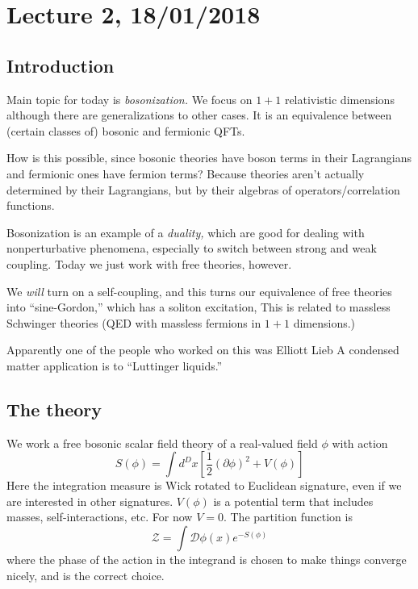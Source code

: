 \section*{Lecture 2, 18/01/2018}
\subsection*{Introduction}

Main topic for today is \emph{bosonization.}
We focus on $1+1$ relativistic dimensions although there are generalizations to other cases.
It is an equivalence between (certain classes of) bosonic and fermionic QFTs.

How is this possible, since bosonic theories have boson terms in their Lagrangians and fermionic ones have fermion terms?
Because theories aren't actually determined by their Lagrangians, but by their algebras of operators/correlation functions.

Bosonization is an example of a \emph{duality,} which are good for dealing with nonperturbative phenomena, especially to switch between strong and weak coupling.
Today we just work with free theories, however.

We \emph{will} turn on a self-coupling, and this turns our equivalence of free theories into ``sine-Gordon,'' which has a soliton excitation, 
This is related to massless Schwinger theories (QED with massless fermions in $1+1$ dimensions.)

Apparently one of the people who worked on this was Elliott Lieb 
A condensed matter application is to ``Luttinger liquids.''

\subsection*{The theory}
We work a free bosonic scalar field theory of a real-valued field $\phi$ with action
\[
S(\phi) = \int d^D x \left [ \frac{1}{2} (\partial \phi)^2 + V(\phi) \right]
\]
Here the integration measure is Wick rotated to Euclidean signature, even if we are interested in other signatures.
$V(\phi)$ is a potential term that includes masses, self-interactions, etc.
For now $V = 0$.
The partition function is
\[
\mathcal{Z} = \int \mathcal{D} \phi(x) e^{-S(\phi)}
\]
where the phase of the action in the integrand is chosen to make things converge nicely, and is the correct choice. 

